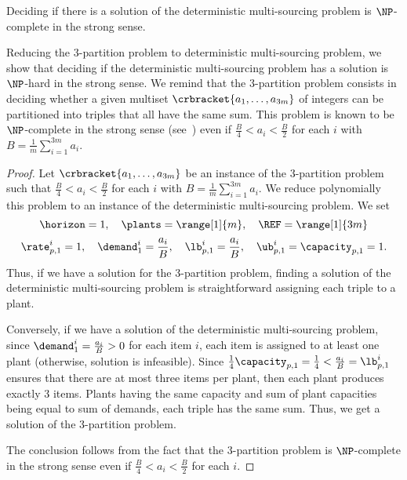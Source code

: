\begin{thm}\label{thm:deterministic-multi-sourcing:strong-NP-hard}
  Deciding if there is a solution of the deterministic multi-sourcing problem is $\NP$-complete in the strong sense.
\end{thm}


Reducing the 3-partition problem to deterministic multi-sourcing problem, we show that deciding if the deterministic multi-sourcing problem has a solution is $\NP$-hard in the strong sense.
We remind that the 3-partition problem consists in deciding whether a given multiset $\crbracket{a_1,\ldots,a_{3m}}$ of integers can be partitioned into triples that all have the same sum.
This problem is known to be $\NP$-complete in the strong sense (see~\cite{Garey1979}) even if $\frac{B}{4} < a_i < \frac{B}{2}$ for each $i$ with $B=\frac{1}{m}\sum_{i=1}^{3m}a_i$.


\begin{proof}
Let $\crbracket{a_1,\ldots,a_{3m}}$ be an instance of the 3-partition problem such that $\frac{B}{4} < a_i < \frac{B}{2}$ for each $i$ with $B=\frac{1}{m}\sum_{i=1}^{3m}a_i$.
We reduce polynomially this problem to an instance of the deterministic multi-sourcing problem.
We set
$$
  \horizon=1
  ,\quad
  \plants=\range[1]{m}
  ,\quad
  \REF=\range[1]{3m}
$$
$$
  \rate_{p,1}^i=1
  ,\quad
  \demand_1^i=\frac{a_i}{B}
  ,\quad
  \lb_{p,1}^i=\frac{a_i}{B}
  ,\quad
  \ub_{p,1}^i=\capacity_{p,1}=1.
$$
Thus, if we have a solution for the 3-partition problem, finding a solution of the deterministic multi-sourcing problem is straightforward assigning each triple to a plant.

Conversely, if we have a solution of the deterministic multi-sourcing problem, since $\demand_1^i=\frac{a_i}{B}>0$ for each item $i$, each item is assigned to at least one plant (otherwise, solution is infeasible).
Since $\frac{1}{4}\capacity_{p,1}=\frac{1}{4} < \frac{a_i}{B} = \lb_{p,1}^i$ ensures that there are at most three items per plant, then each plant produces exactly 3 items.
Plants having the same capacity and sum of plant capacities being equal to sum of demands, each triple has the same sum.
Thus, we get a solution of the 3-partition problem.

The conclusion follows from the fact that the 3-partition problem is $\NP$-complete in the strong sense even if $\frac{B}{4} < a_i < \frac{B}{2}$ for each $i$.
\end{proof}


